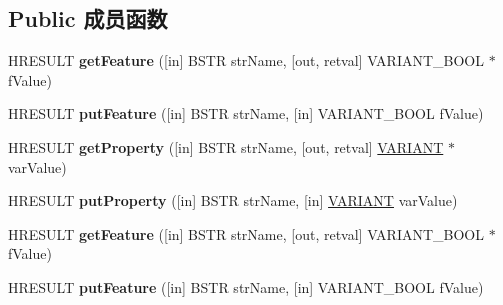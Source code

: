 \subsection*{Public 成员函数}
\begin{DoxyCompactItemize}
\item 
\mbox{\label{interface_m_s_x_m_l2_1_1_i_m_x_x_m_l_filter_a4b58d7b1e852fa7b5a01e8c14caf6848}} 
H\+R\+E\+S\+U\+LT {\bfseries get\+Feature} (\mbox{[}in\mbox{]} B\+S\+TR str\+Name, \mbox{[}out, retval\mbox{]} V\+A\+R\+I\+A\+N\+T\+\_\+\+B\+O\+OL $\ast$f\+Value)
\item 
\mbox{\label{interface_m_s_x_m_l2_1_1_i_m_x_x_m_l_filter_adbee1039f6c49c3e7e6eb96d282411af}} 
H\+R\+E\+S\+U\+LT {\bfseries put\+Feature} (\mbox{[}in\mbox{]} B\+S\+TR str\+Name, \mbox{[}in\mbox{]} V\+A\+R\+I\+A\+N\+T\+\_\+\+B\+O\+OL f\+Value)
\item 
\mbox{\label{interface_m_s_x_m_l2_1_1_i_m_x_x_m_l_filter_a80eb32493dc137061fe837ecb424af9a}} 
H\+R\+E\+S\+U\+LT {\bfseries get\+Property} (\mbox{[}in\mbox{]} B\+S\+TR str\+Name, \mbox{[}out, retval\mbox{]} \hyperlink{structtag_v_a_r_i_a_n_t}{V\+A\+R\+I\+A\+NT} $\ast$var\+Value)
\item 
\mbox{\label{interface_m_s_x_m_l2_1_1_i_m_x_x_m_l_filter_ae9e3ce45564337260d4661a3b9bb1a06}} 
H\+R\+E\+S\+U\+LT {\bfseries put\+Property} (\mbox{[}in\mbox{]} B\+S\+TR str\+Name, \mbox{[}in\mbox{]} \hyperlink{structtag_v_a_r_i_a_n_t}{V\+A\+R\+I\+A\+NT} var\+Value)
\item 
\mbox{\label{interface_m_s_x_m_l2_1_1_i_m_x_x_m_l_filter_a4b58d7b1e852fa7b5a01e8c14caf6848}} 
H\+R\+E\+S\+U\+LT {\bfseries get\+Feature} (\mbox{[}in\mbox{]} B\+S\+TR str\+Name, \mbox{[}out, retval\mbox{]} V\+A\+R\+I\+A\+N\+T\+\_\+\+B\+O\+OL $\ast$f\+Value)
\item 
\mbox{\label{interface_m_s_x_m_l2_1_1_i_m_x_x_m_l_filter_adbee1039f6c49c3e7e6eb96d282411af}} 
H\+R\+E\+S\+U\+LT {\bfseries put\+Feature} (\mbox{[}in\mbox{]} B\+S\+TR str\+Name, \mbox{[}in\mbox{]} V\+A\+R\+I\+A\+N\+T\+\_\+\+B\+O\+OL f\+Value)

\end{DoxyCompactItemize}

